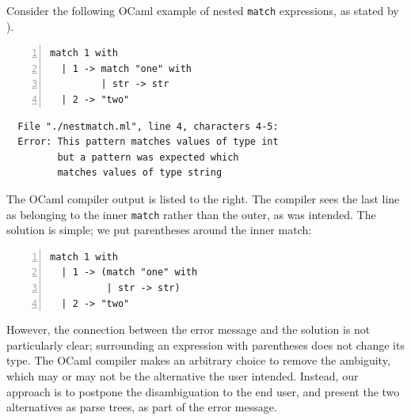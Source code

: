 \documentclass[acmsmall,review,anonymous]{acmart}\settopmatter{printfolios=true,printccs=false,printacmref=false}
\newcommand{\ocaml}{\lstinline[language={[objective]caml}]}
\begin{document}
Consider the following OCaml example of nested \verb|match| expressions, as stated by \cite{palmkvistCreatingDomainSpecificLanguages2019}).

\begin{minipage}{.35\textwidth}
\begin{lstlisting}[language={[objective]caml},numbers=left]
match 1 with
  | 1 -> match "one" with
         | str -> str
  | 2 -> "two"
\end{lstlisting}
\end{minipage}
\vrule
\begin{minipage}{\textwidth}
\begin{lstlisting}
  File "./nestmatch.ml", line 4, characters 4-5:
  Error: This pattern matches values of type int
         but a pattern was expected which
         matches values of type string
\end{lstlisting}
\end{minipage}


\noindent The OCaml compiler output is listed to the right. The compiler sees the last line as belonging to the inner \ocaml{match} rather than the outer, as was intended. The solution is simple; we put parentheses around the inner match:

\begin{minipage}{\textwidth}
\begin{lstlisting}[language={[objective]caml},numbers=left]
match 1 with
  | 1 -> (match "one" with
          | str -> str)
  | 2 -> "two"
\end{lstlisting}
\end{minipage}

\noindent However, the connection between the error message and the solution is not particularly clear; surrounding an expression with parentheses does not change its type.
%
%
%
%
%
%
The OCaml compiler makes an arbitrary choice to remove the ambiguity, which may or may not be the alternative the user intended. Instead, our approach is to postpone the disambiguation to the end user, and present the two alternatives as parse trees, as part of the error message.
\end{document}
